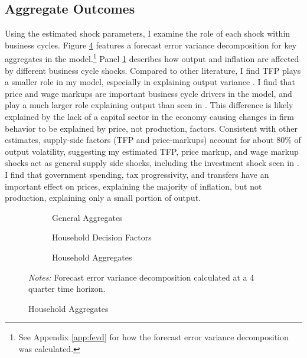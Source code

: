 \subsection{Aggregate Outcomes}

Using the estimated shock parameters, I examine the role of each shock within business cycles. Figure \ref{fig:agg-var-decomp} features a forecast error variance decomposition for key aggregates in the model.\footnote{See Appendix \ref{app:fevd} for how the forecast error variance decomposition was calculated.} Panel \ref{subfig:gen-aggs} describes how output and inflation are affected by different business cycle shocks. Compared to other literature, I find TFP plays a smaller role in my model, especially in explaining output variance \autocites{smets2007shocks}{bayer2024shocks}. I find that price and wage markups are important business cycle drivers in the model, and play a much larger role explaining output than seen in \textcite{bayer2024shocks}. This difference is likely explained by the lack of a capital sector in the economy causing changes in firm behavior to be explained by price, not production, factors. Consistent with other estimates, supply-side factors (TFP and price-markups) account for about 80\% of output volatility, suggesting my estimated TFP, price markup, and wage markup shocks act as general supply side shocks, including the investment shock seen in \textcite{bayer2024shocks}. I find that government spending, tax progressivity, and transfers have an important effect on prices, explaining the majority of inflation, but not production, explaining only a small portion of output.

\begin{figure}[t]
    \centering
    \caption{Variance Decomposition: Aggregates}
    \begin{subfigure}[t]{\textwidth}
        \centering
        \caption{General Aggregates}
        
        \label{subfig:gen-aggs}
    \end{subfigure}
    \begin{subfigure}[t]{\textwidth}
        \centering
        \caption{Household Decision Factors}
        
        \label{subfig:hh-dec-aggs}
    \end{subfigure}
    \begin{subfigure}[t]{\textwidth}
        \centering
        \caption{Household Aggregates}
        
        \label{subfig:hh-agg-aggs}
    \end{subfigure}
    {\scriptsize \textit{Notes:} Forecast error variance decomposition calculated at a 4 quarter time horizon.}
    \label{fig:agg-var-decomp}
\end{figure}

